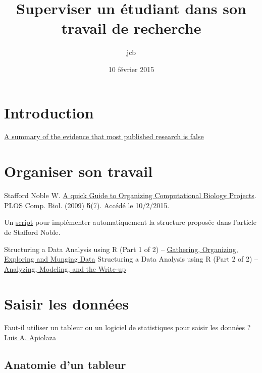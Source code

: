 \documentclass[]{article}
\title{Superviser un étudiant dans son travail de recherche}
\author{jcb}
\date{10 février 2015}
\begin{document}
\maketitle


{
\hypersetup{linkcolor=black}
\setcounter{tocdepth}{2}
\tableofcontents
}
\section{Introduction}\label{introduction}

\href{http://simplystatistics.org/2013/12/16/a-summary-of-the-evidence-that-most-published-research-is-false/}{A
summary of the evidence that most published research is false}

\section{Organiser son travail}\label{organiser-son-travail}

Stafford Noble W.
\href{http://journals.plos.org/ploscompbiol/article?id=10.1371/journal.pcbi.1000424}{A
quick Guide to Organizing Computational Biology Projects}. PLOS Comp.
Biol. (2009) \textbf{5}(7). Accédé le 10/2/2015.

Un
\href{https://github.com/chendaniely/computational-project-cookie-cutter}{script}
pour implémenter automatiquement la structure proposée dans l'article de
Stafford Noble.

Structuring a Data Analysis using R (Part 1 of 2) --
\href{http://datatechblog.com/2013/12/data-analysis-using-r-gathering-organizing-munging/}{Gathering,
Organizing, Exploring and Munging Data} Structuring a Data Analysis
using R (Part 2 of 2) --
\href{http://datatechblog.com/2014/01/structuring-data-analysis-using-r-part-2-2-analyzing-modeling-write/}{Analyzing,
Modeling, and the Write-up}

\section{Saisir les données}\label{saisir-les-donnees}

Faut-il utiliser un tableur ou un logiciel de statistiques pour saisir
les données ?
\href{http://http://www.quantumforest.com/2013/12/excel-fanaticism-and-r/}{Luis
A. Apiolaza}

\subsection{Anatomie d'un tableur}\label{anatomie-dun-tableur}
\end{document}
